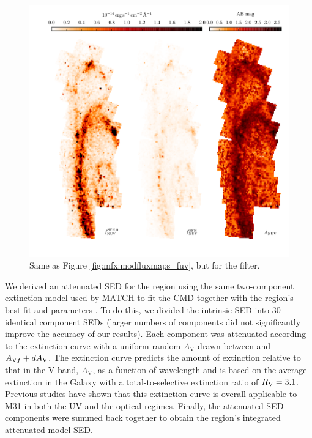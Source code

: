 \documentclass[iop, tighten]{emulateapj}
\begin{document}
\begin{figure}
\centering
\includegraphics[width=\textwidth]{m31flux-figures/modfluxmaps_nuv.pdf}
\caption[\nuv{} flux map modeled from the .]{Same as Figure
    \ref{fig:mfx:modfluxmaps_fuv}, but for the \nuv{} filter.
}
\label{fig:mfx:modfluxmaps_nuv}
\end{figure}


We derived an attenuated SED for the region using the same two-component
extinction model used by MATCH to fit the CMD together with the region's
best-fit \avf{} and \dav{} parameters \citep{Lewis:2014}. To do this, we
divided the intrinsic SED into 30 identical component SEDs (larger numbers of
components did not significantly improve the accuracy of our results). Each
component was attenuated according to the \citet{Cardelli:1989} extinction
curve with a uniform random $A_\mathrm{V}$ drawn between \avf{} and $A_{\mathrm{V}f} +
dA_\mathrm{V}$. The \citet{Cardelli:1989} extinction curve predicts the amount of
extinction relative to that in the V band, $A_\mathrm{V}$, as a function of
wavelength and is based on the average extinction in the Galaxy with a
total-to-selective extinction ratio of $R_\mathrm{V} = 3.1$. Previous studies have shown
that this extinction curve is overall applicable to M31 in both the UV
\citep{Bianchi:1996} and the optical \citep{Barmby:2000} regimes. Finally, the
attenuated SED components were summed back together to obtain the region's
integrated attenuated model SED.
\end{document}

